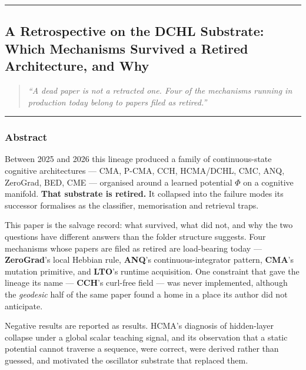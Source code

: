 \documentclass[
  11pt,
  a4paper,
]{article}
\begin{document}
\begin{center}\rule{0.5\linewidth}{0.5pt}\end{center}

\newpage

\subsection{A Retrospective on the DCHL Substrate: Which Mechanisms
Survived a Retired Architecture, and
Why}\label{a-retrospective-on-the-dchl-substrate-which-mechanisms-survived-a-retired-architecture-and-why}

\begin{quote}
\emph{``A dead paper is not a retracted one. Four of the mechanisms
running in production today belong to papers filed as retired.''}
\end{quote}

\begin{center}\rule{0.5\linewidth}{0.5pt}\end{center}

\subsubsection{Abstract}\label{abstract}

Between 2025 and 2026 this lineage produced a family of continuous-state
cognitive architectures --- CMA, P-CMA, CCH, HCMA/DCHL, CMC, ANQ,
ZeroGrad, BED, CME --- organised around a learned potential \(\Phi\) on
a cognitive manifold. \textbf{That substrate is retired.} It collapsed
into the failure modes its successor formalises as the classifier,
memorisation and retrieval traps.

This paper is the salvage record: what survived, what did not, and why
the two questions have different answers than the folder structure
suggests. Four mechanisms whose papers are filed as retired are
load-bearing today --- \textbf{ZeroGrad}'s local Hebbian rule,
\textbf{ANQ}'s continuous-integrator pattern, \textbf{CMA}'s mutation
primitive, and \textbf{LTO}'s runtime acquisition. One constraint that
gave the lineage its name --- \textbf{CCH}'s curl-free field --- was
never implemented, although the \emph{geodesic} half of the same paper
found a home in a place its author did not anticipate.

Negative results are reported as results. HCMA's diagnosis of
hidden-layer collapse under a global scalar teaching signal, and its
observation that a static potential cannot traverse a sequence, were
correct, were derived rather than guessed, and motivated the oscillator
substrate that replaced them.
\end{document}

